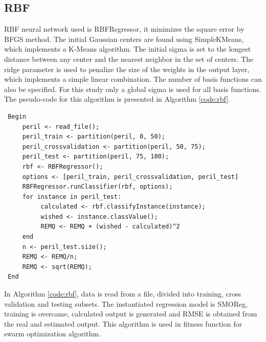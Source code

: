 \subsection{RBF}

RBF neural network used is RBFRegressor, it minimizes the square error by BFGS method. The initial Gaussian centers are found using SimpleKMeans, which implements a K-Means algorithm. The initial sigma is set to the longest distance between any center and the nearest neighbor in the set of centers. The ridge parameter is used to penalize the size of the weights in the output layer, which implements a simple linear combination. The number of basis functions can also be specified. For this study only a global sigma is used for all basis functions. The pseudo-code for this algorithm is presented in Algorithm \ref{code:rbf}.

\begin{small}
\label{code:rbf}
\begin{verbatim}
 Begin
     peril <- read_file();
     peril_train <- partition(peril, 0, 50);
     peril_crossvalidation <- partition(peril, 50, 75);
     peril_test <- partition(peril, 75, 100);
     rbf <- RBFRegressor();
     options <- [peril_train, peril_crossvalidation, peril_test]
     RBFRegressor.runClassifier(rbf, options);
     for instance in peril_test:
          calculated <- rbf.classifyInstance(instance);
          wished <- instance.classValue();
          REMQ <- REMQ + (wished - calculated)^2
     end
     n <- peril_test.size();
     REMQ <- REMQ/n;
     REMQ <- sqrt(REMQ);
 End
\end{verbatim}
\end{small}

In Algorithm \ref{code:rbf}, data is read from a file, divided into training, cross validation and testing subsets. The instantiated regression model is  SMOReg, training is overcame, calculated output is generated and RMSE is obtained from the real and estimated output. This algorithm is used in fitness function for swarm optimization algorithm.

